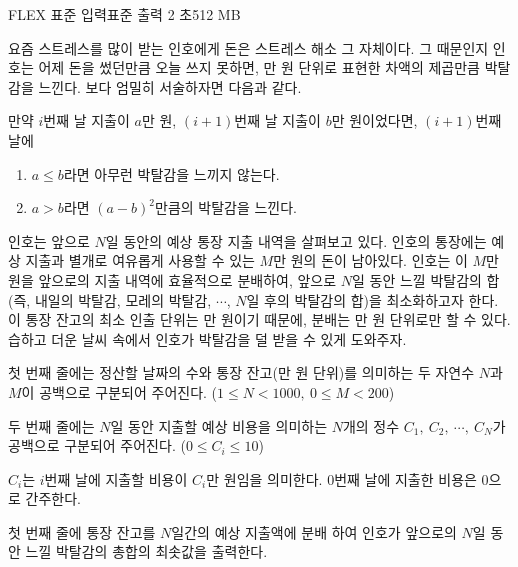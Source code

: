 \begin{problem}{FLEX}
    {표준 입력}{표준 출력}
    {2 초}{512 MB}{}
    
    요즘 스트레스를 많이 받는 인호에게 돈은 스트레스 해소 그 자체이다. 그 때문인지 인호는 어제 돈을 썼던만큼 오늘 쓰지 못하면, 만 원 단위로 표현한 차액의 제곱만큼 박탈감을 느낀다. 보다 엄밀히 서술하자면 다음과 같다.
    
    만약 $ i $번째 날 지출이 $ a $만 원, $ (i+1) $번째 날 지출이 $ b $만 원이었다면, $ (i+1) $번째 날에
    
    \begin{enumerate}
        \item $ a \leq b $라면 아무런 박탈감을 느끼지 않는다.
        \item $ a > b $라면 $ (a - b)^2 $만큼의 박탈감을 느낀다.
    \end{enumerate}
    인호는 앞으로 $ N $일 동안의 예상 통장 지출 내역을 살펴보고 있다. 인호의 통장에는 예상 지출과 별개로 여유롭게 사용할 수 있는 $ M $만 원의 돈이 남아있다. 인호는 이 $ M $만 원을 앞으로의 지출 내역에 효율적으로 분배하여, 앞으로 $ N $일 동안 느낄 박탈감의 합(즉, 내일의 박탈감, 모레의 박탈감, $ \cdots $, $ N $일 후의 박탈감의 합)을 최소화하고자 한다. 이 통장 잔고의 최소 인출 단위는 만 원이기 때문에, 분배는 만 원 단위로만 할 수 있다. 습하고 더운 날씨 속에서 인호가 박탈감을 덜 받을 수 있게 도와주자.
    
    \InputFile
    
    첫 번째 줄에는 정산할 날짜의 수와 통장 잔고(만 원 단위)를 의미하는 두 자연수 $ N $과 $ M $이 공백으로 구분되어 주어진다. ($ 1 \leq N < 1000,\ 0 \leq M < 200 $)
    
    두 번째 줄에는 $ N $일 동안 지출할 예상 비용을 의미하는 $ N $개의 정수 $ C_1,\ C_2,\ \cdots,\ C_N $가 공백으로 구분되어 주어진다. ($ 0 \leq C_i \leq 10 $)
    
    $ C_i $는 $ i $번째 날에 지출할 비용이 $ C_i $만 원임을 의미한다. 0번째 날에 지출한 비용은 0으로 간주한다.
    
    \OutputFile
    첫 번째 줄에 통장 잔고를 $ N $일간의 예상 지출액에 분배 하여 인호가 앞으로의 $ N $일 동안 느낄 박탈감의 총합의 최솟값을 출력한다.
    
    \Examples
    
    \begin{example}
    \end{example}
    
    \Explanation
    

\end{problem}
